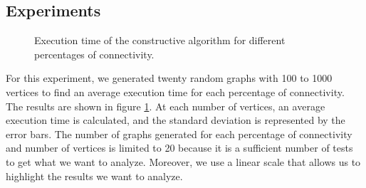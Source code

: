 
\subsection{Experiments}

\begin{figure}[H]
    \centering
    \caption{Execution time of the constructive algorithm for different percentages of connectivity.}
    \label{fig:constructive_time}
\end{figure}

For this experiment, we generated twenty random graphs with 100 to 1000 vertices to find an average execution time for each percentage of connectivity. The results are shown in figure \ref{fig:constructive_time}. At each number of vertices, an average execution time is calculated, and the standard deviation is represented by the error bars. The number of graphs generated for each percentage of connectivity and number of vertices is limited to 20 because it is a sufficient number of tests to get what we want to analyze. Moreover, we use a linear scale that allows us to highlight the results we want to analyze.